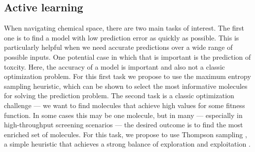 \subsection{Active learning}

When navigating chemical space, there are two main tasks of interest.  The first one is to find a model with low prediction error as quickly as possible.
This is particularly helpful when we need accurate predictions over a wide range of possible inputs. One potential case in which that is important is the prediction of toxcity.  Here, the accuracy of a model is important and  also not a classic optimization problem. For this first task we propose to use the maximum entropy sampling heuristic, which can be shown to select the most informative molecules for solving
the prediction problem.  The second task is a classic optimization challenge --- we want to find molecules that achieve high values for some fitness
function.  In some cases this may be one molecule, but in many --- especially in high-throughput screening scenarios \cite{pyzer-knapp_what_2015} --- the
desired outcome is to find the most enriched set of molecules. For this task, we propose to use Thompson sampling \cite{thompson_likelihood_1933}, a simple
heuristic that achieves a strong balance of exploration and exploitation \cite{Chapelle2011}.